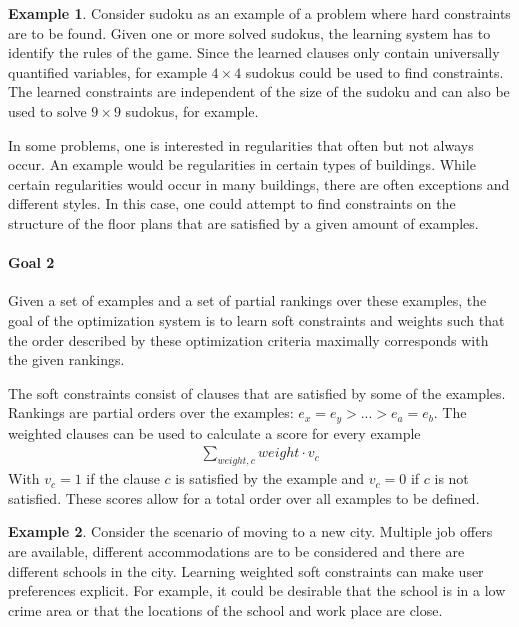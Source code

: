 \documentclass[letterpaper]{article}
\theoremstyle{definition}
\newtheorem{example}{Example}
\begin{document}
\begin{example}
  Consider sudoku as an example of a problem where hard constraints are to be found.
  Given one or more solved sudokus, the learning system has to identify the rules of the game.
  Since the learned clauses only contain universally quantified variables, for example $4 \times 4$ sudokus could be used to find constraints.
  The learned constraints are independent of the size of the sudoku and can also be used to solve $9 \times 9$ sudokus, for example.

  In some problems, one is interested in regularities that  often but not always occur.
  An example would be regularities in certain types of buildings.
  While certain regularities would occur in many buildings, there are often exceptions and different styles.
  In this case, one could attempt to find constraints on the structure of the floor plans that are satisfied by a given amount of examples.
\end{example}

\begin{framed}
  \noindent
  \begin{minipage}{\textwidth}
    \paragraph*{Goal 2}
    Given a set of examples and a set of partial rankings over these examples, the goal of the optimization system is to learn soft constraints and weights such that the order described by these optimization criteria maximally corresponds with the given rankings.
  \end{minipage}
\end{framed}

The soft constraints consist of clauses that are satisfied by some of the examples.
Rankings are partial orders over the examples: $e_x = e_y > ... > e_a = e_b$.
The weighted clauses can be used to calculate a score for every example
\begin{eqnarray*}
  \sum\limits_{\mathit{weight}, \mathit{c}} \mathit{weight} \cdot v_{c}
\end{eqnarray*}
With $v_c = 1$ if the clause $c$ is satisfied by the example and $v_c = 0$ if $c$ is not satisfied.
These scores allow for a total order over all examples to be defined. 

\begin{example}
  Consider the scenario of moving to a new city.
  Multiple job offers are available, different accommodations are to be considered and there are different schools in the city.
  Learning weighted soft constraints can make user preferences explicit.
  For example, it could be desirable that the school is in a low crime area or that the locations of the school and work place are close.
\end{example}
\end{document}
